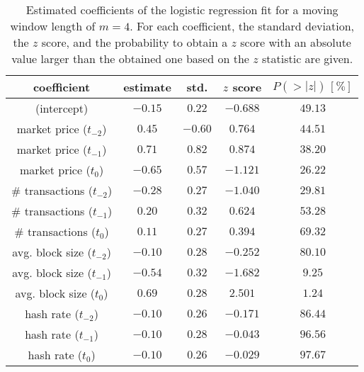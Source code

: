 \begin{table}[h!]
\centering
\begin{tabular}{c||c|c|c|c}
coefficient & estimate & std. & $z$ score & $P(>|z|)\,[\%]$ \\
 \hline
 \hline
(intercept) & $-0.15$ & $0.22$ & $-0.688$ & $49.13$ \\  
 \hline
 market price ($t_{-2}$) & $0.45$ & $-0.60$ & $0.764$ & $44.51$\\   
 \hline
market price ($t_{-1}$) & $0.71$ & $0.82$ & $0.874$ & $38.20$\\
\hline
market price ($t_{0}$) & $-0.65$ & $0.57$ & $-1.121$ & $26.22$\\
\hline
\# transactions ($t_{-2}$) & $-0.28$ & $0.27$ & $-1.040$ & $29.81$\\
\hline
\# transactions ($t_{-1}$) & $0.20$ & $0.32$ & $0.624$ & $53.28$\\
\hline
\# transactions ($t_{0}$) & $0.11$ & $0.27$ & $0.394$ & $69.32$\\
\hline
avg. block size ($t_{-2}$) & $-0.10$ & $0.28$ & $-0.252$ & $80.10$\\
\hline
avg. block size ($t_{-1}$) & $-0.54$ & $0.32$ & $-1.682$ & $9.25$\\
\hline
avg. block size ($t_{0}$) & $0.69$ & $0.28$ & $2.501$ & $1.24$\\
\hline
hash rate ($t_{-2}$) & $-0.10$ & $0.26$ & $-0.171$ & $86.44$\\
\hline
hash rate ($t_{-1}$) & $-0.10$ & $0.28$ & $-0.043$ & $96.56$\\
\hline
hash rate ($t_{0}$) & $-0.10$ & $0.26$ & $-0.029$ & $97.67$\\
\end{tabular}
 \caption{Estimated coefficients of the logistic regression fit for a moving window length of $m=4$. For each coefficient, the standard deviation, the $z$ score, and the probability to obtain a $z$ score with an absolute value larger than the obtained one based on the $z$ statistic are given.}
 \label{tab:log_coef}
\end{table}

